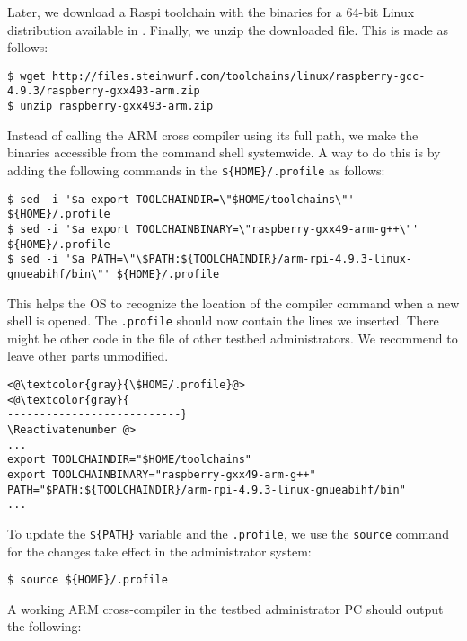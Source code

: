 Later, we download a \ac{Raspi} toolchain with the binaries for a 64-bit Linux
distribution available in \cite{2016steinwurfrpitoolchain}. Finally, we unzip the
downloaded file. This is made as follows:

\begin{lstlisting}[]
$ wget http://files.steinwurf.com/toolchains/linux/raspberry-gcc-4.9.3/raspberry-gxx493-arm.zip
$ unzip raspberry-gxx493-arm.zip
\end{lstlisting}
\FloatBarrier
\vspace{-5mm}

Instead of calling the ARM cross compiler using its full path, we make
the binaries accessible from the command shell systemwide. A way to do
this is by adding the following commands in the \texttt{\$\{HOME\}/.profile}
as follows:

\begin{lstlisting}[]
$ sed -i '$a export TOOLCHAINDIR=\"$HOME/toolchains\"' ${HOME}/.profile
$ sed -i '$a export TOOLCHAINBINARY=\"raspberry-gxx49-arm-g++\"' ${HOME}/.profile
$ sed -i '$a PATH=\"\$PATH:${TOOLCHAINDIR}/arm-rpi-4.9.3-linux-gnueabihf/bin\"' ${HOME}/.profile
\end{lstlisting}
\FloatBarrier
\vspace{-5mm}

This helps the \ac{OS} to recognize the location of the compiler
command when a new shell is opened. The \texttt{.profile} should now
contain the lines we inserted. There might be other
code in the file of other testbed administrators. We recommend to leave
other parts unmodified.
\Suppressnumber\begin{lstlisting}[]
<@\textcolor{gray}{\$HOME/.profile}@>
<@\textcolor{gray}{
---------------------------}
\Reactivatenumber @>
...
export TOOLCHAINDIR="$HOME/toolchains"
export TOOLCHAINBINARY="raspberry-gxx49-arm-g++"
PATH="$PATH:${TOOLCHAINDIR}/arm-rpi-4.9.3-linux-gnueabihf/bin"
...
\end{lstlisting}
\FloatBarrier
\vspace{-5mm}

To update the \texttt{\$\{PATH\}} variable and the \texttt{.profile}, we
use the \texttt{source} command for the changes take effect in the
administrator system:
\begin{lstlisting}[]
$ source ${HOME}/.profile
\end{lstlisting}
\FloatBarrier
\vspace{-5mm}

A working ARM cross-compiler in the testbed administrator \ac{PC} should
output the following:

